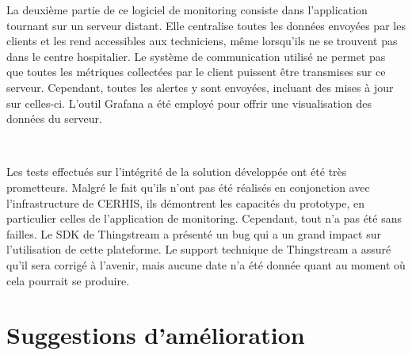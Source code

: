 \noindent
La deuxième partie de ce logiciel de monitoring consiste dans l'application tournant sur un serveur distant. Elle centralise toutes les données envoyées par les clients et les rend accessibles aux techniciens, même lorsqu'ils ne se trouvent pas dans le centre hospitalier. Le système de communication utilisé ne permet pas que toutes les métriques collectées par le client puissent être transmises sur ce serveur. Cependant, toutes les alertes y sont envoyées, incluant des mises à jour sur celles-ci. L'outil Grafana a été employé pour offrir une visualisation des données du serveur.

~

\noindent
Les tests effectués sur l'intégrité de la solution développée ont été très prometteurs. Malgré le fait qu'ils n'ont pas été réalisés en conjonction avec l'infrastructure de CERHIS, ils démontrent les capacités du prototype, en particulier celles de l'application de monitoring. Cependant, tout n'a pas été sans failles. Le SDK de Thingstream a présenté un bug qui a un grand impact sur l'utilisation de cette plateforme. Le support technique de Thingstream a assuré qu'il sera corrigé à l'avenir, mais aucune date n'a été donnée quant au moment où cela pourrait se produire.

\section{Suggestions d'amélioration}

